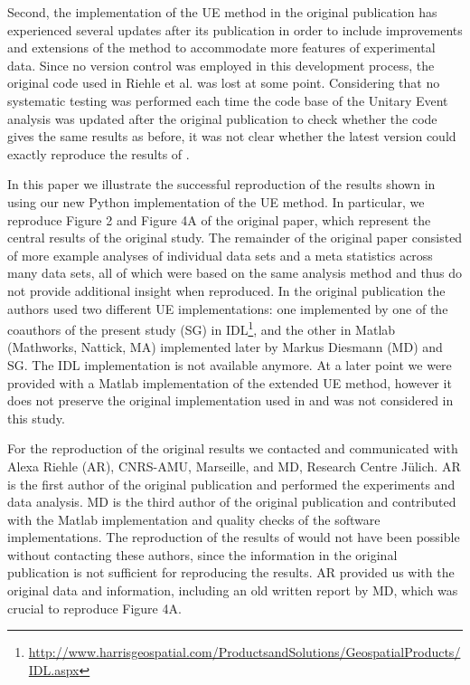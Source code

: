 \documentclass[10pt,a4paper,onecolumn]{article}
\begin{document}
Second, the implementation of the UE method in the original publication
has experienced several updates after its publication in order to
include improvements and extensions of the method to accommodate more
features of experimental data. Since no version control was employed in
this development process, the original code used in Riehle et al.
\autocite{Riehle97} was lost at some point. Considering that no
systematic testing was performed each time the code base of the Unitary
Event analysis was updated after the original publication to check
whether the code gives the same results as before, it was not clear
whether the latest version could exactly reproduce the results of
\autocite{Riehle97}.

In this paper we illustrate the successful reproduction of the results
shown in \autocite{Riehle97} using our new Python implementation of the
UE method. In particular, we reproduce Figure 2 and Figure 4A of the
original paper, which represent the central results of the original
study. The remainder of the original paper consisted of more example
analyses of individual data sets and a meta statistics across many data
sets, all of which were based on the same analysis method and thus do
not provide additional insight when reproduced. In the original
publication the authors used two different UE implementations: one
implemented by one of the coauthors of the present study (SG) in
IDL\footnote{\url{http://www.harrisgeospatial.com/ProductsandSolutions/GeospatialProducts/IDL.aspx}},
and the other in Matlab (Mathworks, Nattick, MA) implemented later by
Markus Diesmann (MD) and SG. The IDL implementation is not available
anymore. At a later point we were provided with a Matlab implementation
of the extended UE method, however it does not preserve the original
implementation used in \autocite{Riehle97} and was not considered in
this study.

For the reproduction of the original results we contacted and
communicated with Alexa Riehle (AR), CNRS-AMU, Marseille, and MD,
Research Centre Jülich. AR is the first author of the original
publication and performed the experiments and data analysis. MD is the
third author of the original publication and contributed with the Matlab
implementation and quality checks of the software implementations. The
reproduction of the results of \autocite{Riehle97} would not have been
possible without contacting these authors, since the information in the
original publication is not sufficient for reproducing the results. AR
provided us with the original data and information, including an old
written report by MD, which was crucial to reproduce Figure 4A.
\end{document}
